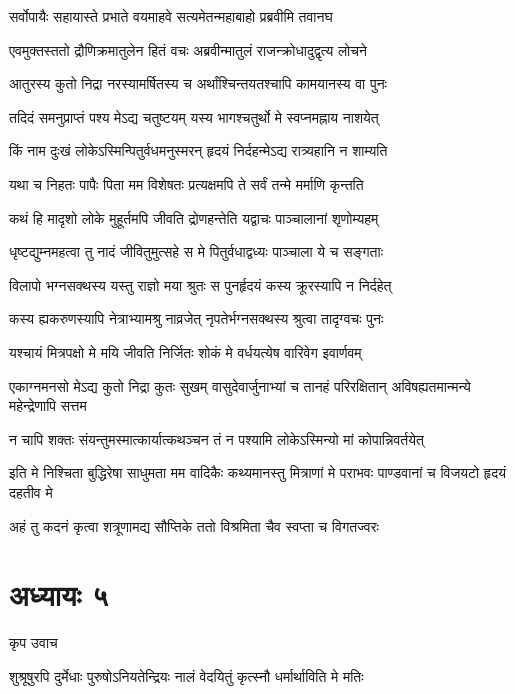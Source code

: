 \twolineshloka
{सर्वोपायैः सहायास्ते प्रभाते वयमाहवे}
{सत्यमेतन्महाबाहो प्रब्रवीमि तवानघ}


\twolineshloka
{एवमुक्तस्ततो द्रौणिक्रमातुलेन हितं वचः}
{अब्रवीन्मातुलं राजन्क्रोधादुद्वृत्य लोचने}


\twolineshloka
{आतुरस्य कुतो निद्रा नरस्यामर्षितस्य च}
{अर्थांश्चिन्तयतश्चापि कामयानस्य वा पुनः}


\twolineshloka
{तदिदं समनुप्राप्तं पश्य मेऽद्य चतुष्टयम्}
{यस्य भागश्चतुर्थो मे स्वप्नमह्नाय नाशयेत्}


\twolineshloka
{किं नाम दुःखं लोकेऽस्मिन्पितुर्वधमनुस्मरन्}
{हृदयं निर्दहन्मेऽद्य रात्र्यहानि न शाम्यति}


\twolineshloka
{यथा च निहतः पापैः पिता मम विशेषतः}
{प्रत्यक्षमपि ते सर्वं तन्मे मर्माणि कृन्तति}


\twolineshloka
{कथं हि मादृशो लोके मुहूर्तमपि जीवति}
{द्रोणहन्तेति यद्वाचः पाञ्चालानां शृणोम्यहम्}


\twolineshloka
{धृष्टद्युम्नमहत्वा तु नादं जीवितुमुत्सहे}
{स मे पितुर्वधाद्वध्यः पाञ्चाला ये च सङ्गताः}


\twolineshloka
{विलापो भग्नसक्थस्य यस्तु राज्ञो मया श्रुतः}
{स पुनर्हृदयं कस्य क्रूरस्यापि न निर्दहेत्}


\twolineshloka
{कस्य ह्यकरुणस्यापि नेत्राभ्यामश्रु नाव्रजेत्}
{नृपतेर्भग्नसक्थस्य श्रुत्वा तादृग्वचः पुनः}


\twolineshloka
{यश्चायं मित्रपक्षो मे मयि जीवति निर्जितः}
{शोकं मे वर्धयत्येष वारिवेग इवार्णवम्}


एकाग्नमनसो मेऽद्य कुतो निद्रा कुतः सुखम्
\twolineshloka
{वासुदेवार्जुनाभ्यां च तानहं परिरक्षितान्}
{अविषह्यतमान्मन्ये महेन्द्रेणापि सत्तम}


\twolineshloka
{न चापि शक्तः संयन्तुमस्मात्कार्यात्कथञ्चन}
{तं न पश्यामि लोकेऽस्मिन्यो मां कोपान्निवर्तयेत्}


इति मे निश्चिता बुद्धिरेषा साधुमता मम
\twolineshloka
{वादिकैः कथ्यमानस्तु मित्राणां मे पराभवः}
{पाण्डवानां च विजयटो हृदयं दहतीव मे}


\twolineshloka
{अहं तु कदनं कृत्वा शत्रूणामद्य सौप्तिके}
{ततो विश्रमिता चैव स्वप्ता च विगतज्वरः}


\chapter{अध्यायः ५}
\twolineshloka
{कृप उवाच}
{}


\twolineshloka
{शुश्रूषुरपि दुर्मेधाः पुरुषोऽनियतेन्द्रियः}
{नालं वेदयितुं कृत्स्नौ धर्मार्थाविति मे मतिः}


